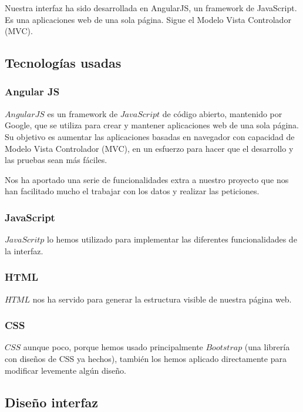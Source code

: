 \documentclass[12pt,a4paper]{article}
\begin{document}
Nuestra interfaz ha sido desarrollada en AngularJS, un framework de JavaScript. Es una aplicaciones web de una sola página. Sigue el Modelo Vista Controlador (MVC).

\subsection{Tecnologías usadas} \label{pto71}
	\subsubsection{Angular JS} \label{pto711}
	
	$AngularJS$ es un framework de $JavaScript$ de código abierto, mantenido por Google, que se utiliza para crear y mantener aplicaciones web de una sola página. Su objetivo es aumentar las aplicaciones basadas en navegador con capacidad de Modelo Vista Controlador (MVC), en un esfuerzo para hacer que el desarrollo y las pruebas sean más fáciles.
	
Nos ha aportado una serie de funcionalidades extra a nuestro proyecto que nos han facilitado mucho el trabajar con los datos y realizar las peticiones.
	\subsubsection{JavaScript} \label{pto712}
	
	$JavaScritp$ lo hemos utilizado para implementar las diferentes funcionalidades de la interfaz.
	
	\subsubsection{HTML} \label{pto713}
	
$HTML$ nos ha servido para generar la estructura visible de nuestra página web.

	\subsubsection{CSS} \label{pto714}
	
	$CSS$ aunque poco, porque hemos usado principalmente $Bootstrap$ (una librería con diseños de CSS ya hechos),  también los hemos aplicado directamente para modificar levemente algún diseño.
	

\newpage
\subsection{Diseño interfaz} \label{pto72}
\end{document}
